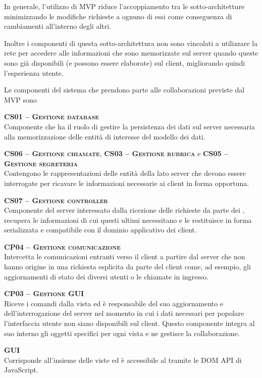 In generale, l'utilizzo di MVP riduce l'accoppiamento tra le sotto-architetture minimizzando le modifiche richieste a ognuno di essi come conseguenza di cambiamenti all'interno degli altri.

Inoltre i componenti di questa sotto-architettura non sono vincolati a utilizzare la rete per accedere alle informazioni che sono memorizzate sul server quando queste sono già disponibili (e possono essere elaborate) sul client, migliorando quindi l'esperienza utente.

Le componenti del sistema che prendono parte alle collaborazioni previste dal  MVP sono
\begin{description}
  \item{\scshape\bfseries CS01 -- Gestione database}\\
Componente che ha il ruolo di gestire la persistenza dei dati sul server necessaria alla memorizzazione delle entità di interesse del modello dei dati.
 
  \item{\textsc{\bfseries CS06 -- Gestione chiamate}, \textsc{\bfseries CS03 -- Gestione rubrica} e \textsc{\bfseries CS05 -- Gestione segreteria}}\\
Contengono le rappresentazioni delle entità della  lato server che devono essere interrogate per ricavare le informazioni necessarie ai client in forma opportuna.

  \item{\scshape\bfseries CS07 -- Gestione controller}\\
Componente del server interessato dalla ricezione delle richieste da parte dei , recupera le informazioni di cui questi ultimi necessitano e le restituisce in forma serializzata e compatibile con il dominio applicativo dei client.

  \item{\scshape\bfseries CP04 -- Gestione comunicazione}\\
Intercetta le comunicazioni entranti verso il client a partire dal server che non hanno origine in una richiesta esplicita da parte del client come, ad esempio, gli aggiornamenti di stato dei diversi utenti o le chiamate in ingresso.
  
  \item{\scshape\bfseries CP03 -- Gestione GUI}\\
Riceve i comandi dalla vista ed è responsabile del suo aggiornamento e dell'interrogazione del server nel momento in cui i dati necessari per popolare l'interfaccia utente non siano disponibili sul client. Questo componente integra al suo interno gli oggetti  specifici per ogni vista e ne gestisce la collaborazione.

  \item{\scshape\bfseries GUI}\\
Corrisponde all'insieme delle viste ed è accessibile al  tramite le DOM API di JavaScript.
\end{description}

